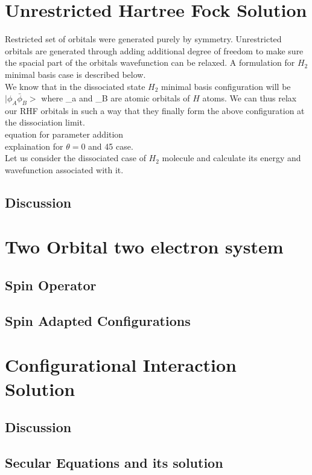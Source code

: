 \documentclass[11pt]{article}   	%
\begin{document}
\section{Unrestricted Hartree Fock Solution}
	Restricted set of orbitals were generated purely by symmetry. Unrestricted orbitals are generated through adding additional degree of freedom to make sure the spacial part of the orbitals wavefunction 
	can be relaxed. A formulation for $H_2$ minimal basis case is described below. \\
	We know that in the dissociated state $H_2$ minimal basis configuration will be $|\phi_A \bar{\phi}_B>$ where \phi_a and \phi_B are atomic orbitals of $H$ atoms. We can thus relax our RHF orbitals in such a way that they 
	finally form the above configuration at the dissociation limit. \\
	equation for parameter addition \\
	explaination for $\theta =0$ and 45 case. \\
	Let us consider the dissociated case of $H_2$ molecule and calculate its energy and wavefunction associated with it. \\
	
	\subsection{Discussion}
\section{Two Orbital two electron system}%
	\subsection{Spin Operator}
	\subsection{Spin Adapted Configurations}
\section{Configurational Interaction Solution}
	\subsection{Discussion}
	\subsection{Secular Equations and its solution}
\end{document}
